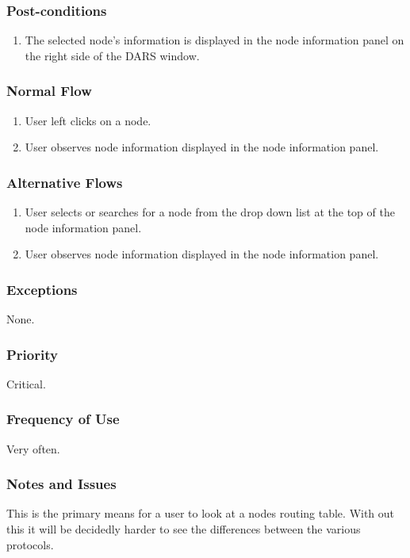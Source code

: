 \documentclass[a4paper,11pt,titlepage]{article}
\begin{document}
\subsubsection{Post-conditions}

\begin{enumerate}
  \item The selected node’s information is displayed in the node information panel on the right side of the DARS window.
\end{enumerate}

\subsubsection{Normal Flow}
\begin{enumerate}
  \item User left clicks on a node.
  \item User observes node information displayed in the node information panel. 
\end{enumerate}

\subsubsection{Alternative Flows}

\begin{enumerate}
  \item User selects or searches for a node from the drop down list at the top of the node information panel.
  \item  User observes node information displayed in the node information panel.
\end{enumerate}


\subsubsection{Exceptions}
None.

\subsubsection{Priority}
Critical.

\subsubsection{Frequency of Use}
Very often.

\subsubsection{Notes and Issues}
This is the primary means for a user to look at a nodes routing table.  With out this it will be decidedly harder to see the differences between the various protocols.
\end{document}
